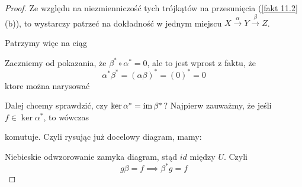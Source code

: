 \begin{proof}
  Ze względu na niezmienniczość tych trójkątów na przesunięcia (\ref{fakt 11.2} (b)), to wystarczy patrzeć na dokładność w jednym miejscu $X\xrightarrow{\alpha} Y\xrightarrow{\beta} Z$.

  Patrzymy więc na ciąg
  \begin{center}\end{center}
  Zaczniemy od pokazania, że $\beta^*\circ\alpha^*=0$, ale to jest wprost z faktu, że 
  $$\alpha^*\beta^*=(\alpha\beta)^*=(0)^*=0$$
  ktore można narysować
  \begin{center}\end{center}
  Dalej chcemy sprawdzić, czy $\ker\alpha^*=\operatorname{im}\beta^*$? Najpierw zauważmy, że jeśli $f\in\ker\alpha^*$, to wówczas
  \begin{center}\end{center}
  komutuje. Czyli rysując już docelowy diagram, mamy:
  \begin{center}\end{center}
  Niebieskie odwzorowanie zamyka diagram, stąd $id$ między $U$. Czyli 
  $$g\beta=f\implies \beta^* g=f$$
\end{proof}

